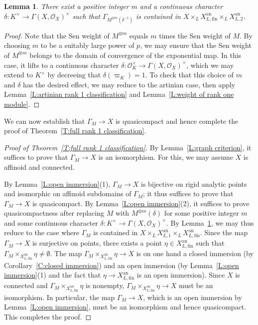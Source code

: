 \documentclass[12pt]{article}
\newtheorem{lemma}[theorem]{Lemma}
\theoremstyle{definition}
\numberwithin{equation}{theorem}
\newcommand{\calO}{\mathcal{O}}
\newcommand{\an}{\mathrm{an}}
\begin{document}
\begin{lemma}\label{L:finite order decomposition}
There exist a positive integer $m$ and a continuous character $\delta: K^\times \to \Gamma(X, \calO_X)^\times$
such that
$\Gamma_{M^{\otimes m}(\delta^{-1})}$ is contained in $X \times_L X^{\an}_{L,\mathrm{fin}} \times_L X^{\an}_{L,2}$.
\end{lemma}
\begin{proof}
Note that the Sen weight of $M^{\otimes m}$ equals $m$ times the Sen weight of $M$. By choosing $m$ to be a suitably large power of $p$, we may ensure that the Sen weight of $M^{\otimes m}$ belongs to the domain of convergence of the exponential map. In this case, it lifts to a continuous character $\delta: \calO_K^\times \to \Gamma(X, \calO_X)^\times$, which we may extend to $K^\times$ by decreeing that $\delta(\varpi_K) = 1$. 
To check that this choice of $m$ and $\delta$ has the desired effect,
we may reduce to the artinian case, then apply
Lemma~\ref{L:artinian rank 1 classification} and
Lemma~\ref{L:weight of rank one module}.
\end{proof}

We can now establish that $\Gamma_M \to X$ is quasicompact and hence complete the proof of Theorem~\ref{T:full rank 1 classification}.
\begin{proof}[Proof of Theorem~\ref{T:full rank 1 classification}]
By Lemma~\ref{L:graph criterion}, it suffices to prove that $\Gamma_M \to X$ is an isomorphism. 
For this, we may assume $X$ is affinoid and connected.

By Lemma~\ref{L:open immersion}(1),
$\Gamma_M \to X$ is bijective on rigid analytic points and isomorphic on affinoid subdomains of $\Gamma_M$; it thus suffices to prove that $\Gamma_M \to X$ is quasicompact. 
By Lemma~\ref{L:open immersion}(2), it suffices to prove quasicompactness after replacing $M$ with $M^{\otimes m}(\delta)$
for some positive integer $m$ and some continuous character $\delta: K^\times \to \Gamma(X,\calO_X)^\times$. By Lemma~\ref{L:finite order decomposition}, we may thus reduce to the case where 
$\Gamma_M$ is contained in $X \times_L X^{\an}_{L,1} \times_L X^{\an}_{L,\mathrm{fin}}$. Since the map $\Gamma_M \to X$ is surjective on points, there exists a point $\eta \in X^{\an}_{L,\mathrm{fin}}$ such that $\Gamma_M \times_{X^{\an}_{L,\mathrm{fin}}} \eta \neq \emptyset$.
The map $\Gamma_M \times_{X^{\an}_{L,\mathrm{fin}}} \eta \to X$ is on one hand a closed immersion (by Corollary~\ref{C:closed immersion})
and an open immersion (by Lemma~\ref{L:open immersion}(1) and the fact that $\eta \to X^{\an}_{L,\mathrm{fin}}$ is an open immersion). Since
$X$ is connected and $\Gamma_M \times_{X^{\an}_{L,\mathrm{fin}}} \eta$
is nonempty, $\Gamma_M \times_{X^{\an}_{L,\mathrm{fin}}} \eta \to X$ must be an isomorphism. In particular, the map $\Gamma_M \to X$, which is an open immersion by Lemma~\ref{L:open immersion}, must be an isomorphism and hence quasicompact. This completes the proof.
\end{proof}
\end{document}
